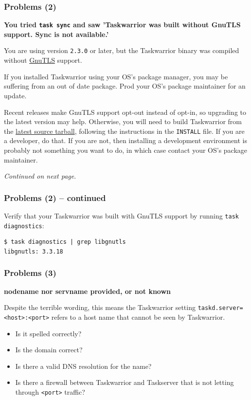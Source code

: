 \documentclass[t,handout]{beamer}
\begin{document}
\begin{frame}[fragile]\frametitle{Problems (2)}
    \vfill
    \textbf{You tried \texttt{task sync} and saw 'Taskwarrior was built without GnuTLS support.  Sync is not available.'}

    You are using version \verb+2.3.0+ or later, but the Taskwarrior binary was compiled without \href{http://www.gnutls.org}{GnuTLS} support.

    If you installed Taskwarrior using your OS's package manager, you may be suffering from an out of date package. Prod your OS's package maintainer for an update.

    Recent releases make GnuTLS support opt-out instead of opt-in, so upgrading to the latest version may help. Otherwise, you will need to build Taskwarrior from the \href{http://taskwarrior.org/download/task-latest.tar.gz}{latest source tarball}, following the instructions in the \verb+INSTALL+ file. If you are a developer, do that. If you are not, then installing a development environment is probably not something you want to do, in which case contact your OS's package maintainer.

    \emph{Continued on next page}.
\end{frame}

\begin{frame}[fragile]\frametitle{Problems (2) -- continued}
    \vfill
    Verify that your Taskwarrior was built with GnuTLS support by running \verb+task diagnostics+:

    \begin{lstlisting}
$ task diagnostics | grep libgnutls
libgnutls: 3.3.18\end{lstlisting}
\end{frame}

\begin{frame}[fragile]\frametitle{Problems (3)}
    \vfill
    \textbf{nodename nor servname provided, or not known}

    Despite the terrible wording, this means the Taskwarrior setting \verb+taskd.server=<host>:<port>+ refers to a host name that cannot be seen by Taskwarrior.

    \begin{itemize}
        \item Is it spelled correctly?
        \item Is the domain correct?
        \item Is there a valid DNS resolution for the name?
        \item Is there a firewall between Taskwarrior and Taskserver that is not letting through \verb+<port>+ traffic?
    \end{itemize}
\end{frame}
\end{document}
